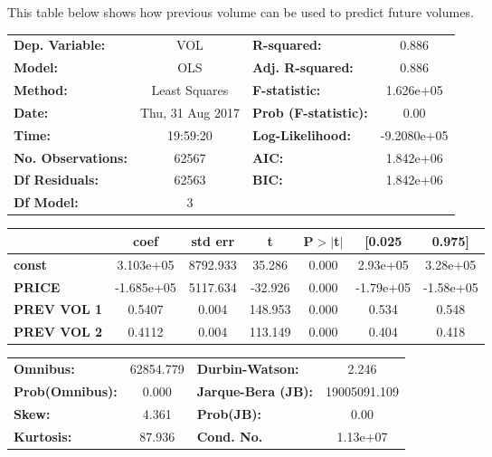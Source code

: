 \documentclass{article}
\begin{document}
This table below shows how previous volume can be used to predict future volumes.
\begin{center}
\begin{tabular}{lclc}
\toprule
\textbf{Dep. Variable:}    &        VOL         & \textbf{  R-squared:         } &      0.886    \\
\textbf{Model:}            &       OLS        & \textbf{  Adj. R-squared:    } &      0.886    \\
\textbf{Method:}           &  Least Squares   & \textbf{  F-statistic:       } &  1.626e+05    \\
\textbf{Date:}             & Thu, 31 Aug 2017 & \textbf{  Prob (F-statistic):} &      0.00     \\
\textbf{Time:}             &     19:59:20     & \textbf{  Log-Likelihood:    } & -9.2080e+05   \\
\textbf{No. Observations:} &       62567      & \textbf{  AIC:               } &  1.842e+06    \\
\textbf{Df Residuals:}     &       62563      & \textbf{  BIC:               } &  1.842e+06    \\
\textbf{Df Model:}         &           3      & \textbf{                     } &               \\
\bottomrule
\end{tabular}
\begin{tabular}{lcccccc}
               & \textbf{coef} & \textbf{std err} & \textbf{t} & \textbf{P$>$$|$t$|$} & \textbf{[0.025} & \textbf{0.975]}  \\
\midrule
\textbf{const} &    3.103e+05  &     8792.933     &    35.286  &         0.000        &     2.93e+05    &     3.28e+05     \\
\textbf{PRICE}    &   -1.685e+05  &     5117.634     &   -32.926  &         0.000        &    -1.79e+05    &    -1.58e+05     \\
\textbf{PREV VOL 1}    &       0.5407  &        0.004     &   148.953  &         0.000        &        0.534    &        0.548     \\
\textbf{PREV VOL 2}    &       0.4112  &        0.004     &   113.149  &         0.000        &        0.404    &        0.418     \\
\bottomrule
\end{tabular}
\begin{tabular}{lclc}
\textbf{Omnibus:}       & 62854.779 & \textbf{  Durbin-Watson:     } &      2.246    \\
\textbf{Prob(Omnibus):} &    0.000  & \textbf{  Jarque-Bera (JB):  } & 19005091.109  \\
\textbf{Skew:}          &    4.361  & \textbf{  Prob(JB):          } &       0.00    \\
\textbf{Kurtosis:}      &   87.936  & \textbf{  Cond. No.          } &   1.13e+07    \\
\bottomrule
\end{tabular}
\end{center} 
\end{document}
